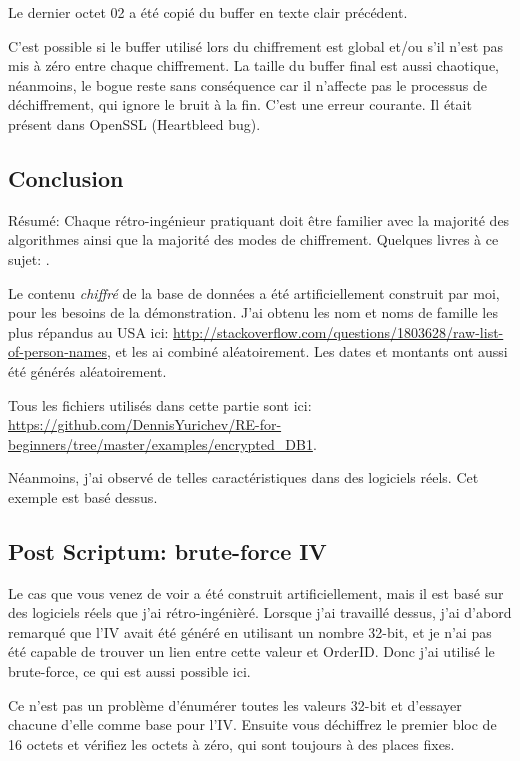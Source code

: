 Le dernier octet 02 a été copié du buffer en texte clair précédent.

C'est possible si le buffer utilisé lors du chiffrement est global et/ou s'il n'est
pas mis à zéro entre chaque chiffrement.
La taille du buffer final est aussi chaotique, néanmoins, le bogue reste sans conséquence
car il n'affecte pas le processus de déchiffrement, qui ignore le bruit à la fin.
C'est une erreur courante.
Il était présent dans OpenSSL (Heartbleed bug).

\subsection{Conclusion}

Résumé:
Chaque rétro-ingénieur pratiquant doit être familier avec la majorité des algorithmes
ainsi que la majorité des modes de chiffrement.
Quelques livres à ce sujet: .

Le contenu \emph{chiffré} de la base de données a été artificiellement construit
par moi, pour les besoins de la démonstration.
J'ai obtenu les nom et noms de famille les plus répandus au USA ici: \url{http://stackoverflow.com/questions/1803628/raw-list-of-person-names},
et les ai combiné aléatoirement.
Les dates et montants ont aussi été générés aléatoirement.

Tous les fichiers utilisés dans cette partie sont ici: \url{https://github.com/DennisYurichev/RE-for-beginners/tree/master/examples/encrypted_DB1}.

Néanmoins, j'ai observé de telles caractéristiques dans des logiciels réels.
Cet exemple est basé dessus.

\subsection{Post Scriptum: brute-force \ac{IV}}

Le cas que vous venez de voir a été construit artificiellement, mais il est basé
sur des logiciels réels que j'ai rétro-ingénièré.
Lorsque j'ai travaillé dessus, j'ai d'abord remarqué que l'\ac{IV} avait été généré
en utilisant un nombre 32-bit, et je n'ai pas été capable de trouver un lien entre
cette valeur et OrderID.
Donc j'ai utilisé le brute-force, ce qui est aussi possible ici.

Ce n'est pas un problème d'énumérer toutes les valeurs 32-bit et d'essayer chacune
d'elle comme base pour l'\ac{IV}.
Ensuite vous déchiffrez le premier bloc de 16 octets et vérifiez les octets à zéro,
qui sont toujours à des places fixes.
